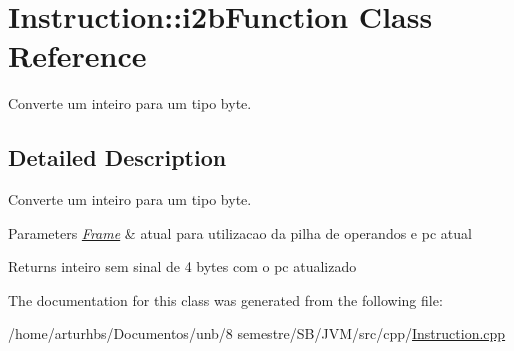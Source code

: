 \hypertarget{classInstruction_1_1i2bFunction}{}\section{Instruction\+:\+:i2b\+Function Class Reference}
\label{classInstruction_1_1i2bFunction}


Converte um inteiro para um tipo byte.  




\subsection{Detailed Description}
Converte um inteiro para um tipo byte. 


\begin{DoxyParams}{Parameters}
{\em \hyperlink{classFrame}{Frame}} & atual para utilizacao da pilha de operandos e pc atual \\
\hline
\end{DoxyParams}
\begin{DoxyReturn}{Returns}
inteiro sem sinal de 4 bytes com o pc atualizado 
\end{DoxyReturn}


The documentation for this class was generated from the following file\+:\begin{DoxyCompactItemize}
\item 
/home/arturhbs/\+Documentos/unb/8 semestre/\+S\+B/\+J\+V\+M/src/cpp/\hyperlink{Instruction_8cpp}{Instruction.\+cpp}\end{DoxyCompactItemize}
